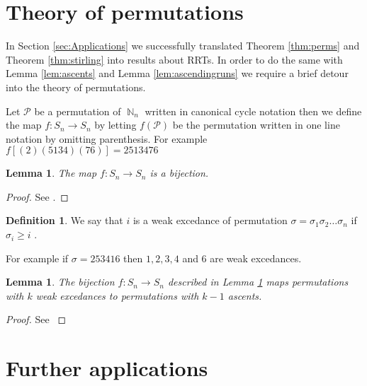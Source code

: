 \documentclass[oneside]{book} %
\newtheorem{lem}[thm]{Lemma}
\theoremstyle{definition}
\newtheorem{defn}[thm]{Definition}
\numberwithin{equation}{section}
\DeclareMathOperator{\N}{\mathbb{N}}
\begin{document}
\section{Theory of permutations}
In Section \ref{sec:Applications} we successfully translated Theorem \ref{thm:perms} and Theorem \ref{thm:stirling} into
results about RRTs. In order to do the same with Lemma \ref{lem:ascents} and Lemma \ref{lem:ascendingruns} we require a brief detour
into the theory of permutations.  

Let $\mathcal{P}$ be a permutation of $\N_n$ written in canonical cycle notation then we define the map 
$f: S_n \rightarrow S_n$ by letting $f(\mathcal{P})$ be the permutation written in one line notation by omitting parenthesis. 
For example $f[(2)(5134)(76)] = 2513476$ 
\begin{lem}\label{lem:bijection}
The map $f: S_n \rightarrow S_n$ is a bijection. 
\end{lem}
\begin{proof}
 See \cite{Bona}.
\end{proof}

\begin{defn}
 We say that $i$ is a weak excedance of permutation $\sigma = \sigma_1\sigma_2\dots \sigma_n$ if $\sigma_i \geq i$ \cite{Bona}.     
\end{defn}
For example if $\sigma = 253416$ then $1,2,3,4$ and 6 are weak excedances. 

\begin{lem}
 The bijection $f: S_n \rightarrow S_n$ described in Lemma \ref{lem:bijection} maps permutations with $k$ weak excedances
 to permutations with $k-1$ ascents.  
\end{lem}
\begin{proof}
 See \cite{Bona}
\end{proof}




\section{Further applications}
\end{document}
